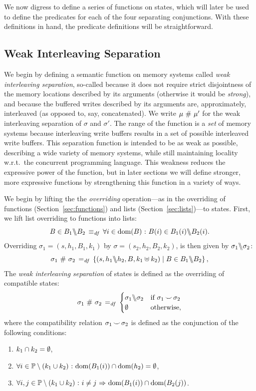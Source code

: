 \documentclass[11pt]{report}
\begin{document}
We now digress to define a series of functions on states, which will later be used to define the predicates for each of the four separating conjunctions. With these definitions in hand, the predicate definitions will be straightforward.

\subsection{Weak Interleaving Separation}
\label{sec:weak-interleaving}

We begin by defining a semantic function on memory systems called \emph{weak interleaving separation}, so-called because it does not require strict disjointness of the memory locations described by its arguments (otherwise it would be \emph{strong}), and because the buffered writes described by its arguments are, approximately, interleaved (as opposed to, say, concatenated). 
We write $\mu \operatorname{\,\#\,} \mu'$ for the weak interleaving separation of $\sigma$ and $\sigma'$. The range of the function is a \emph{set} of memory systems because interleaving write buffers results in a set of possible interleaved write buffers. This separation function is intended to be as weak as possible, describing a wide variety of memory systems, while still maintaining locality w.r.t.\ the concurrent programming language. This weakness reduces the expressive power of the function, but in later sections we will define stronger, more expressive functions by strengthening this function in a variety of ways. 

We begin by lifting the the \emph{overriding} operation---as in the overriding of functions (Section~\ref{sec:functions}) and lists (Section~\ref{sec:lists})---to states. First, we lift list overriding to functions into lists: \[ B \in B_1 \backslash\!\!\backslash B_2 \operatorname{\;\equiv_{\mathit{df}}\;} \forall i \in \operatorname{\mathrm{dom}}(B) \operatorname{\,:\,} B(i) \in B_1(i) \backslash\!\!\backslash B_2(i). \] Overriding $\sigma_1 = (s,h_1,B_1,k_1)$ by $\sigma = (s_2,h_2,B_2,k_2)$, is then given by $\sigma_1 \backslash\!\!\backslash \sigma_2$: \[ \sigma_1 \operatorname{\,\#\,} \sigma_2 \operatorname{\;=_{\mathit{df}}\;} \left\lbrace (s,h_1 \backslash\!\!\backslash h_2, B,k_1 \uplus k_2) \mid B \in B_1 \backslash\!\!\backslash B_2 \right\rbrace,\] The \emph{weak interleaving separation} of states is defined as the overriding of compatible states: \[ \sigma_1 \operatorname{\,\#\,} \sigma_2 \operatorname{\;=_{\mathit{df}}\;} \begin{cases}
  \sigma_1 \backslash\!\!\backslash \sigma_2 & \text{if $\sigma_1 \operatorname{\smile} \sigma_2$} \\ 
  \operatorname{\emptyset} & \text{otherwise,} \end{cases} \] where the compatibility relation $\sigma_1 \operatorname{\smile} \sigma_2$ is defined as the conjunction of the following conditions: \begin{enumerate}
  \item $k_1 \cap k_2 = \operatorname{\emptyset}$,
  \item $\forall i \in \mathbb{P} \setminus (k_1 \cup k_2) \operatorname{\,:\,} \operatorname{\mathrm{dom}}(B_1(i)) \cap \operatorname{\mathrm{dom}}(h_2) = \operatorname{\emptyset}$, 
  \item $\forall i,j \in \mathbb{P} \setminus (k_1 \cup k_2) \operatorname{\,:\,} i \neq j \operatorname{\,\Rightarrow\,} \operatorname{\mathrm{dom}}(B_1(i)) \cap \operatorname{\mathrm{dom}}(B_2(j))$. 
\end{enumerate}
\end{document}
